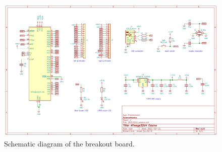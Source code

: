 \begin{multicols}{2}
\begin{figure}
  \centering
  \includegraphics[width=\textwidth]{20210211_eduino}
  \caption{Schematic diagram of the breakout board.}\label{fig.m32u4_sch}
\end{figure}


\end{multicols}

